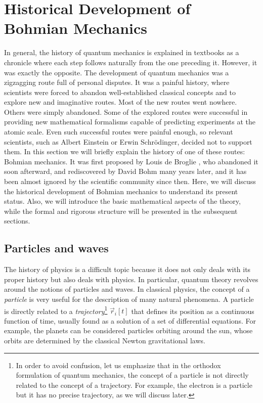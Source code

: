 \documentclass[onecolumn,nofootinbib, secnumarabic, amsmath, nobibnotes,11pt,aps,pra]{revtex4-1}
\begin{document}
\section{Historical Development of Bohmian Mechanics}\label{om.sec_intro}

In general, the history of quantum mechanics is explained in
textbooks as a chronicle where each step follows naturally from the
one preceding it. However, it was exactly the opposite. The
development of quantum mechanics was a zigzagging route full of
personal disputes. It was a painful history, where scientists were
forced to abandon well-established classical concepts and to explore
new and imaginative routes. Most of the new routes went nowhere.
Others were simply abandoned. Some of the explored routes were
successful in providing new mathematical formalisms capable of
predicting experiments at the atomic scale. Even such successful
routes were painful enough, so relevant scientists, such as Albert
Einstein or Erwin Schr\"odinger, decided not to support them. In
this section we will briefly explain the history of one of these
routes: Bohmian mechanics. It was first proposed by Louis de Broglie
\cite{om.debroglie1923}, who abandoned it soon afterward, and
rediscovered by David Bohm \cite{om.bohm1952a,om.bohm1952b} many years
later, and it has been almost ignored by the scientific community
since then. Here, we will discuss the historical development of
Bohmian mechanics to understand its present status. Also, we will
introduce the basic mathematical aspects of the theory, while the
formal and rigorous structure will be presented in the subsequent 
sections.

\subsection{Particles and waves}\label{om.sec_intro.1}

The history of physics is a difficult topic because it does not only
deals with its proper history but also deals with physics. In particular,
quantum theory revolves around the notions of particles and waves.
In classical physics, the concept of a \textit{particle} is very
useful for the description of many natural phenomena. A particle is
directly related to a \textit{trajectory}\footnote{In order to avoid
confusion, let us emphasize that in the orthodox formulation of
quantum mechanics, the concept of a particle is not directly related
to the concept of a trajectory. For example, the electron is a
particle but it has no precise trajectory, as we will discuss
later.} $\vec{r}_{i}[t]$ that defines its position as a continuous
function of time, usually found as a solution of a set of
differential equations. For example, the planets can be considered
particles orbiting around the sun, whose orbits are determined by
the classical Newton gravitational laws.
\end{document}
